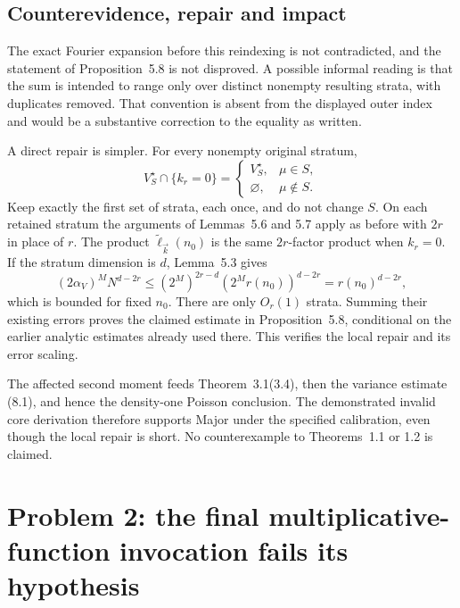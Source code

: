 \documentclass[10pt]{article}
\begin{document}
\subsection*{Counterevidence, repair and impact}
The exact Fourier expansion before this reindexing is not contradicted, and the statement of Proposition 5.8 is not disproved. A possible informal reading is that the sum is intended to range only over distinct nonempty resulting strata, with duplicates removed. That convention is absent from the displayed outer index and would be a substantive correction to the equality as written.\par
A direct repair is simpler. For every nonempty original stratum, \[V_S^\star\cap\{k_r=0\}=
 \begin{cases}
   V_S^\star,&\mu\in S,\\
   \varnothing,&\mu\notin S.
 \end{cases}                                                    \tag{R1}\] Keep exactly the first set of strata, each once, and do not change \(S\). On each retained stratum the arguments of Lemmas 5.6 and 5.7 apply as before with \(2r\) in place of \(r\). The product \(\widetilde\ell_{\vec k}(n_0)\) is the same \(2r\)-factor product when \(k_r=0\). If the stratum dimension is \(d\), Lemma 5.3 gives \[(2\alpha_V)^M N^{d-2r}
 \le (2^M)^{2r-d}(2^M r(n_0))^{d-2r}
 =r(n_0)^{d-2r},\] which is bounded for fixed \(n_0\). There are only \(O_r(1)\) strata. Summing their existing errors proves the claimed estimate in Proposition 5.8, conditional on the earlier analytic estimates already used there. This verifies the local repair and its error scaling.\par
The affected second moment feeds Theorem 3.1(3.4), then the variance estimate (8.1), and hence the density-one Poisson conclusion. The demonstrated invalid core derivation therefore supports Major under the specified calibration, even though the local repair is short. No counterexample to Theorems 1.1 or 1.2 is claimed.\par
\section*{Problem 2: the final multiplicative-function invocation fails its hypothesis}
\end{document}
